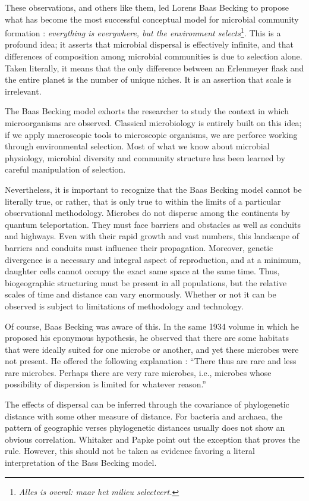 These observations, and others like them, led Lorens Baas Becking to propose what has become the most successful conceptual model for microbial community formation : {\em everything is everywhere, but the environment selects}\footnote{{\em Alles is overal: maar het milieu selecteert.}}. This is a profound idea; it asserts that microbial dispersal is effectively infinite, and that differences of composition among microbial communities is due to selection alone. Taken literally, it means that the only difference between an Erlenmeyer flask and the entire planet is the number of unique niches. It is an assertion that scale is irrelevant.

The Baas Becking model exhorts the researcher to study the context in which microorganisms are observed. Classical microbiology is entirely built on this idea; if we apply macroscopic tools to microscopic organisms, we are perforce working through environmental selection. Most of what we know about microbial physiology, microbial diversity and community structure has been learned by careful manipulation of selection.

Nevertheless, it is important to recognize that the Baas Becking model cannot be literally true, or rather, that is only true to within the limits of a particular observational methodology. Microbes do not disperse among the continents by quantum teleportation. They must face barriers and obstacles as well as conduits and highways. Even with their rapid growth and vast numbers, this landscape of barriers and conduits must influence their propagation. Moreover, genetic divergence is a necessary and integral aspect of reproduction, and at a minimum, daughter cells cannot occupy the exact same space at the same time. Thus, biogeographic structuring must be present in all populations, but the relative scales of time and distance can vary enormously. Whether or not it can be observed is subject to limitations of methodology and technology.

Of course, Baas Becking was aware of this. In the same 1934 volume in which he proposed his eponymous hypothesis, he observed that there are some habitats that were ideally suited for one microbe or another, and yet these microbes were not present. He offered the following explanation : ``There thus are rare and less rare microbes. Perhaps there are very rare microbes, i.e., microbes whose possibility of dispersion is limited for whatever reason.''

The effects of dispersal can be inferred through the covariance of phylogenetic distance with some other measure of distance. For bacteria and archaea, the pattern of geographic verses phylogenetic distances usually does not show an obvious correlation. Whitaker and Papke point out the exception that proves the rule. However, this should not be taken as evidence favoring a literal interpretation of the Bass Becking model.

